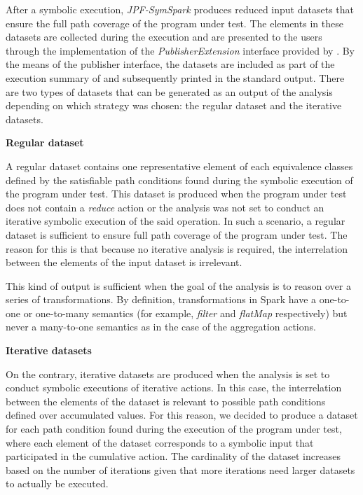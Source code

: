 \label{subsec:module:output}

%
%

After a symbolic execution, \textit{JPF-SymSpark} produces reduced input datasets that ensure the full path coverage of the program under test. The elements in these datasets are collected during the execution and are presented to the users through the implementation of the \textit{PublisherExtension} interface provided by \jpf{}. By the means of the publisher interface, the datasets are included as part of the execution summary of \jpf{} and subsequently printed in the standard output. There are two types of datasets that can be generated as an output of the analysis depending on which strategy was chosen: the regular dataset and the iterative datasets.

\textbf{Regular dataset}

A regular dataset contains one representative element of each equivalence classes defined by the satisfiable path conditions found during the symbolic execution of the program under test. This dataset is produced when the program under test does not contain a \textit{reduce} action or the analysis was not set to conduct an iterative symbolic execution of the said operation. In such a scenario, a regular dataset is sufficient to ensure full path coverage of the program under test. The reason for this is that because no iterative analysis is required, the interrelation between the elements of the input dataset is irrelevant. 

This kind of output is sufficient when the goal of the analysis is to reason over a series of transformations. By definition, transformations in Spark have a one-to-one or one-to-many semantics (for example, \textit{filter} and \textit{flatMap} respectively) but never a many-to-one semantics as in the case of the aggregation actions. 

\textbf{Iterative datasets}

On the contrary, iterative datasets are produced when the analysis is set to conduct symbolic executions of iterative actions. In this case, the interrelation between the elements of the dataset is relevant to possible path conditions defined over accumulated values. For this reason, we decided to produce a dataset for each path condition found during the execution of the program under test, where each element of the dataset corresponds to a symbolic input that participated in the cumulative action. The cardinality of the dataset increases based on the number of iterations given that more iterations need larger datasets to actually be executed.


